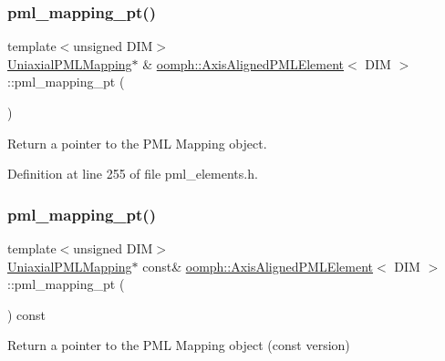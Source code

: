 \subsubsection{\texorpdfstring{pml\+\_\+mapping\+\_\+pt()}{pml\_mapping\_pt()}\hspace{0.1cm}{\footnotesize\ttfamily [1/2]}}
{\footnotesize\ttfamily template$<$unsigned D\+IM$>$ \\
\hyperlink{classoomph_1_1UniaxialPMLMapping}{Uniaxial\+P\+M\+L\+Mapping}$\ast$ \& \hyperlink{classoomph_1_1AxisAlignedPMLElement}{oomph\+::\+Axis\+Aligned\+P\+M\+L\+Element}$<$ D\+IM $>$\+::pml\+\_\+mapping\+\_\+pt (\begin{DoxyParamCaption}{ }\end{DoxyParamCaption})\hspace{0.3cm}{\ttfamily [inline]}}



Return a pointer to the P\+ML Mapping object. 



Definition at line 255 of file pml\+\_\+elements.\+h.

\mbox{\label{classoomph_1_1AxisAlignedPMLElement_ab67dd8501cbdeb896ff34d3cd8645434}} 
\subsubsection{\texorpdfstring{pml\+\_\+mapping\+\_\+pt()}{pml\_mapping\_pt()}\hspace{0.1cm}{\footnotesize\ttfamily [2/2]}}
{\footnotesize\ttfamily template$<$unsigned D\+IM$>$ \\
\hyperlink{classoomph_1_1UniaxialPMLMapping}{Uniaxial\+P\+M\+L\+Mapping}$\ast$ const\& \hyperlink{classoomph_1_1AxisAlignedPMLElement}{oomph\+::\+Axis\+Aligned\+P\+M\+L\+Element}$<$ D\+IM $>$\+::pml\+\_\+mapping\+\_\+pt (\begin{DoxyParamCaption}{ }\end{DoxyParamCaption}) const\hspace{0.3cm}{\ttfamily [inline]}}



Return a pointer to the P\+ML Mapping object (const version) 



